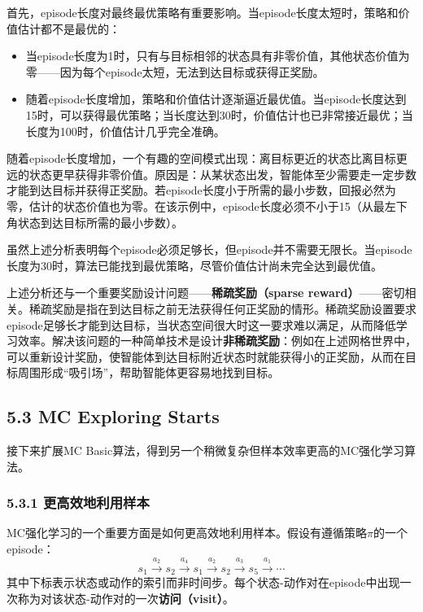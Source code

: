 \documentclass[UTF8]{article}
\begin{document}
首先，episode长度对最终最优策略有重要影响。当episode长度太短时，策略和价值估计都不是最优的：
\begin{itemize}
    \item 当episode长度为1时，只有与目标相邻的状态具有非零价值，其他状态价值为零——因为每个episode太短，无法到达目标或获得正奖励。
    \item 随着episode长度增加，策略和价值估计逐渐逼近最优值。当episode长度达到15时，可以获得最优策略；当长度达到30时，价值估计也已非常接近最优；当长度为100时，价值估计几乎完全准确。
\end{itemize}

随着episode长度增加，一个有趣的空间模式出现：离目标更近的状态比离目标更远的状态更早获得非零价值。原因是：从某状态出发，智能体至少需要走一定步数才能到达目标并获得正奖励。若episode长度小于所需的最小步数，回报必然为零，估计的状态价值也为零。在该示例中，episode长度必须不小于15（从最左下角状态到达目标所需的最小步数）。

\begin{remarkbox}[备注]
    虽然上述分析表明每个episode必须足够长，但episode并不需要无限长。当episode长度为30时，算法已能找到最优策略，尽管价值估计尚未完全达到最优值。
\end{remarkbox}

上述分析还与一个重要奖励设计问题——\textbf{稀疏奖励（sparse reward）}——密切相关。稀疏奖励是指在到达目标之前无法获得任何正奖励的情形。稀疏奖励设置要求episode足够长才能到达目标，当状态空间很大时这一要求难以满足，从而降低学习效率。解决该问题的一种简单技术是设计\textbf{非稀疏奖励}：例如在上述网格世界中，可以重新设计奖励，使智能体到达目标附近状态时就能获得小的正奖励，从而在目标周围形成“吸引场”，帮助智能体更容易地找到目标。

\subsection*{5.3 MC Exploring Starts}

接下来扩展MC Basic算法，得到另一个稍微复杂但样本效率更高的MC强化学习算法。

\subsubsection*{5.3.1 更高效地利用样本}

MC强化学习的一个重要方面是如何更高效地利用样本。假设有遵循策略$\pi$的一个episode：
\[
s_1 \xrightarrow{a_2} s_2 \xrightarrow{a_4} s_1 \xrightarrow{a_2} s_2 \xrightarrow{a_3} s_5 \xrightarrow{a_1} \cdots
\]
其中下标表示状态或动作的索引而非时间步。每个状态-动作对在episode中出现一次称为对该状态-动作对的一次\textbf{访问（visit）}。
\end{document}
